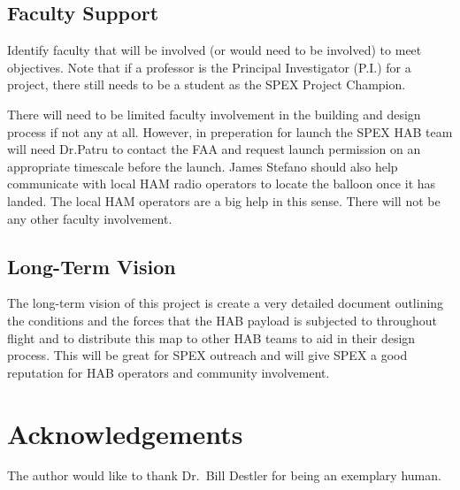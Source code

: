 \documentclass[journal]{SPEXformat}
\newenvironment{help}{
  \ttfamily\footnotesize\sloppy
  \begin{lrbox}{\helpbox}\begin{minipage}{\linewidth}
  }{
  \end{minipage}\end{lrbox}
  \ifbool{showhelp}{
    \fbox{\usebox{\helpbox}}
  }{}
}
\begin{document}
\subsection{Faculty Support}
\begin{help}
  Identify faculty that will be involved (or would need to be involved) to meet objectives.
  Note that if a professor is the Principal Investigator (P.I.) for a project, there still needs to be a student as the SPEX Project Champion.
\end{help}
  There will need to be limited faculty involvement in the building and design process if not any at all. However, in preperation for launch
  the SPEX HAB team will need Dr.Patru to contact the FAA and request launch permission on an appropriate timescale before the launch.
  James Stefano should also help communicate with local HAM radio operators to locate the balloon once it has landed. The local HAM
  operators are a big help in this sense. There will not be any other faculty involvement.
\subsection{Long-Term Vision}
\label{sec:vision}
  The long-term vision of this project is create a very detailed document outlining the conditions and the forces that the HAB payload
  is subjected to throughout flight and to distribute this map to other HAB teams to aid in their design process. This will be great for
  SPEX outreach and will give SPEX a good reputation for HAB operators and community involvement.

\section*{Acknowledgements}
The author would like to thank Dr.~Bill Destler for being an exemplary human.
\end{document}

